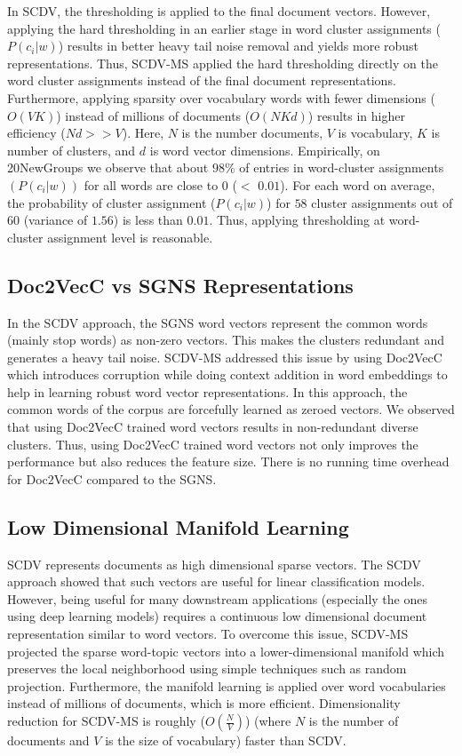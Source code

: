 \documentclass{ecai}
\newcommand{\method}{SCDV-MS}
\begin{document}
In SCDV, the thresholding is applied to the final document vectors. However, applying the hard thresholding in an earlier stage in word cluster assignments ($P(c_i|w)$) results in better heavy tail noise removal and yields more robust representations. Thus, \method{} applied the hard thresholding directly on the word cluster assignments instead of the final document representations. Furthermore, applying sparsity over vocabulary words with fewer dimensions ($O(VK)$) instead of millions of documents ($O(NKd)$) results in higher efficiency ($Nd >> V$). Here, $N$ is the number documents, $V$ is vocabulary, $K$ is number of clusters, and $d$ is word vector dimensions. Empirically, on 20NewGroups we observe that about $98\%$ of entries in word-cluster assignments $(P(c_i|w))$  for all words are close to $0$ ($<$ $0.01$). For each word on average, the probability of cluster assignment ($P(c_i|w)$) for $58$ cluster assignments out of $60$ (variance of $1.56$) is less than $0.01$. Thus, applying thresholding at word-cluster assignment level is reasonable. 

\subsection{Doc2VecC vs SGNS Representations}
\label{subsec:doc2vecC}
In the SCDV approach, the SGNS  word vectors represent the common words (mainly stop words) as non-zero vectors. This makes the clusters redundant and generates a heavy tail noise. \method{} addressed this issue by using Doc2VecC \cite{chen2017efficient} which introduces corruption while doing context addition in word embeddings to help in learning robust word vector representations. In this approach, the common words of the corpus are forcefully learned as zeroed vectors. We observed that using Doc2VecC trained word vectors results in non-redundant diverse clusters. Thus, using Doc2VecC trained word vectors not only improves the performance but also reduces the feature size. There is no running time overhead for Doc2VecC compared to the SGNS.

\subsection{Low Dimensional Manifold Learning}
\label{subsec:manifold}
SCDV \cite{mekala2017scdv} represents documents as high dimensional sparse vectors. The SCDV approach showed that such vectors are useful for linear classification models. However, being useful for many downstream applications (especially the ones using deep learning models) requires a continuous low dimensional document representation similar to word vectors. To overcome this issue, \method{} projected the sparse word-topic vectors into a lower-dimensional manifold which preserves the local neighborhood using simple techniques such as random projection. Furthermore, the manifold learning is applied over word vocabularies instead of millions of documents, which is more efficient. Dimensionality reduction for SCDV-MS is roughly ($O(\frac{N}{V})$) (where $N$ is the number of documents and $V$ is the size of vocabulary) faster than SCDV.
\end{document}

